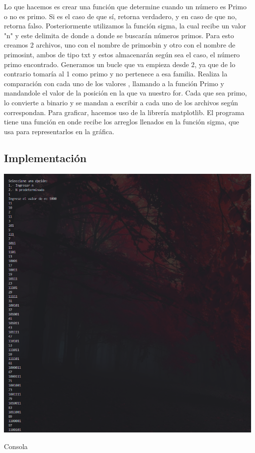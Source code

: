 \documentclass{article}
\begin{document}
Lo que hacemos es crear una función que determine cuando un número es Primo o no es primo. Si es el caso de que sí, retorna verdadero, y en caso de que no, retorna falso. Posteriormente utilizamos la función sigma, la cual recibe un valor "n" y este delimita de donde a donde se buscarán  números primos.  
\newline\newline
Para esto creamos 2 archivos, uno con el nombre de primosbin y otro con el nombre de primosint, ambos de tipo txt y estos almacenarán según sea el caso, el número primo encontrado.
Generamos un bucle que va empieza desde 2, ya que de lo contrario tomaría al 1 como primo y no pertenece a esa familia. Realiza la comparación con cada uno de los valores , llamando a la función Primo y mandandole el valor de la posición en la que va nuestro for. Cada que sea primo, lo convierte a binario y se mandan a escribir a cada uno de los archivos según correspondan.
\newline\newline
Para graficar, hacemos uso de la librería matplotlib. El programa tiene una función en onde recibe los arreglos llenados en la función sigma, que usa para representarlos en la gráfica. 


\subsection{Implementación}
\begin{center}
    \includegraphics[scale = 0.5]{TestSistema.PNG}
    \caption{Consola}
\end{center}
\end{document}
